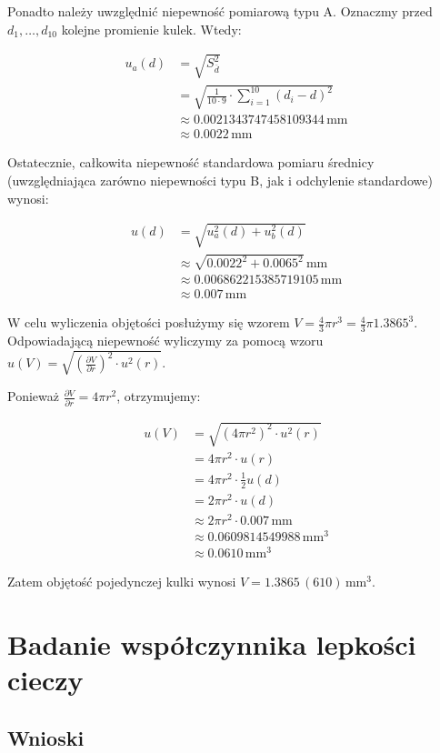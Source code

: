 \documentclass[a4paper]{article}
\begin{document}
Ponadto należy uwzględnić niepewność pomiarową typu A.
Oznaczmy przed $d_1, \dots, d_{10}$ kolejne promienie kulek.
Wtedy:

\begin{align*}
	u_a(d) &= \sqrt{S^{2}_{\overline{d}}} \\
	&= \sqrt{\frac{1}{10 \cdot 9} \cdot \sum_{i=1}^{10} (d_i - d)^2} \\
	&\approx 0.0021343747458109344 \, \text{mm} \\
	&\approx 0.0022 \, \text{mm}
\end{align*}

Ostatecznie, całkowita niepewność standardowa pomiaru średnicy (uwzględniająca zarówno niepewności typu B, jak i odchylenie standardowe) wynosi:

\begin{align*}
	u(d) &= \sqrt{u_a^2(d) + u_b^2(d)} \\
	&\approx \sqrt{0.0022^2 + 0.0065^2} \, \text{mm} \\
	&\approx 0.006862215385719105 \, \text{mm} \\
	&\approx 0.007 \, \text{mm}
\end{align*}

W celu wyliczenia objętości posłużymy się wzorem $V = \frac 4 3 \pi r^3 = \frac 4 3 \pi 1.3865^3$.
Odpowiadającą niepewność wyliczymy za pomocą wzoru $u(V) = \sqrt{\left(\frac{\partial V}{\partial r}\right)^2 \cdot u^2(r)}$.

Ponieważ $\frac{\partial V}{\partial r} = 4 \pi r^2$, otrzymujemy:

\begin{align*}
	u(V) &= \sqrt{\left(4 \pi r^2\right)^2 \cdot u^2(r)} \\
	&= 4 \pi r^2 \cdot u(r) \\
	&= 4 \pi r^2 \cdot \frac 1 2 u(d) \\
	&= 2 \pi r^2 \cdot u(d) \\
	&\approx 2 \pi r^2 \cdot 0.007 \, \text{mm} \\
	&\approx 0.0609814549988 \, \text{mm}^3 \\
	&\approx 0.0610 \, \text{mm}^3
\end{align*}

Zatem objętość pojedynczej kulki wynosi $V = 1.3865 \, (610) \, \text{mm}^3$.

\section{Badanie współczynnika lepkości cieczy}

\subsection{Wnioski}
\end{document}
